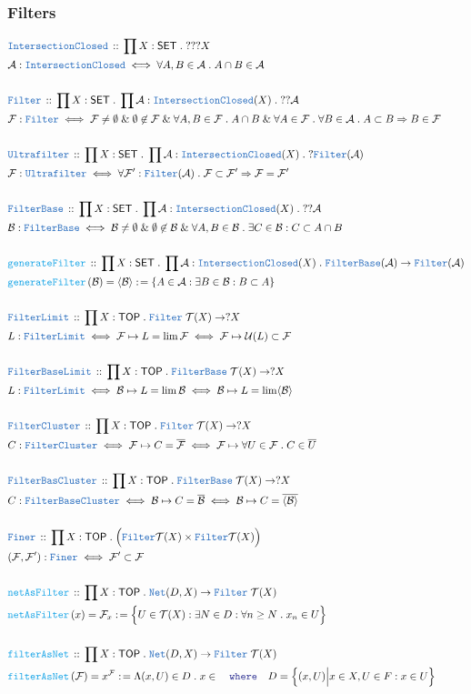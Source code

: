 \documentclass[12pt]{scrartcl}
\newcommand{\TYPE}[1]{\textcolor{NavyBlue}{\mathtt{#1}}}
\newcommand{\FUNC}[1]{\textcolor{Cerulean}{\mathtt{#1}}}
\newcommand{\LOGIC}[1]{\textcolor{Blue}{\mathtt{#1}}}
\renewcommand{\.}{\; . \;}
\newcommand{\de}{: \kern 0.1pc =}
\newcommand{\where}{\LOGIC{where}}
\newcommand{\Act}[1]{\left( #1 \right)}
\newcommand{\DeclareType}[2]{& \TYPE{#1} \, :: \, #2 \\}
\newcommand{\DefineType}[3]{& #1 : \TYPE{#2} \iff #3 \\}
\newcommand{\DefineNamedType}[4]{& #1 : \TYPE{#2} \iff #3 \iff #4 \\}
\newcommand{\DeclareFunc}[2]{& \FUNC{#1} \, :: \, #2 \\}
\newcommand{\DefineNamedFunc}[4]{&  \FUNC{#1}\Act{#2} = #3 \de #4 \\}
\newcommand{\Page}[1]{ \begin{align*} #1 \end{align*}   }
\renewcommand{\And}{\; \& \;}
\newcommand{\Imply}{\Rightarrow}
\newcommand{\A}{\mathcal{A}}
\newcommand{\B}{\mathcal{B}}
\newcommand{\SET}{\mathsf{SET}}
\newcommand{\TOP}{\mathsf{TOP}}
\newcommand{\T}{\mathcal{T}}
\newcommand{\U}{\mathcal{U}}
\newcommand{\F}{\mathcal{F}}
\begin{document}
\subsubsection{Filters}
\Page{
	\DeclareType{IntersectionClosed}{\prod X : \SET \. ???X}
	\DefineType{\A}{IntersectionClosed}{\forall A,B \in \A \. A \cap B \in \A}
	\\
	\DeclareType{Filter}{\prod X : \SET \. \prod \A : \TYPE{IntersectionClosed}(X) \. ??\A}
	\DefineType{\F}{Filter}{
		\F \neq \emptyset \And 
		\emptyset \not\in \F \And 
		\forall A,B \in \F \. A \cap B \And
		\forall A \in \F \. \forall B \in \A \. A \subset B \Imply B \in \F
	}
	\\
	\DeclareType{Ultrafilter}{\prod X : \SET \. \prod \A : \TYPE{IntersectionClosed}(X) \. ?\TYPE{Filter}(\A)}
	\DefineType{\F}{Ultrafilter}{
		\forall \F' : \TYPE{Filter}(\A) \.  \F \subset \F'  \Imply \F = \F'
	}
	\\
	\DeclareType{FilterBase}{\prod X : \SET \. \prod \A : \TYPE{IntersectionClosed}(X) \. ??\A}
	\DefineType{\B}{FilterBase}{
		\B  \neq \emptyset \And \emptyset \not \in \B \And \forall A,B \in \B \. \exists C \in \B : C \subset A \cap B
	}
	\\
	\DeclareFunc{generateFilter}{ 
		\prod X : \SET \. 
		\prod \A : \TYPE{IntersectionClosed}(X) \. 
		\TYPE{FilterBase}(\A) \to \TYPE{Filter}(\A) 
	}
	\DefineNamedFunc{generateFilter}{\B }{\langle \B \rangle}
	{
		\{ A \in \A : \exists B \in \B : B \subset A \}
	}
	\\
	\DeclareType{FilterLimit}{\prod X : \TOP \. \TYPE{Filter}\;\T(X) \to ?X}
	\DefineNamedType{L}{FilterLimit}{\F \mapsto  L = \lim \F}
	{ \F \mapsto \U(L) \subset \F }
	\\
	\DeclareType{FilterBaseLimit}{\prod X : \TOP \. \TYPE{FilterBase}\;\T(X) \to ?X}
	\DefineNamedType{L}{FilterLimit}{\B \mapsto  L = \lim \B}
	{ \B \mapsto L = \lim \langle \B \rangle  }
	\\
	\DeclareType{FilterCluster}{\prod X : \TOP \. \TYPE{Filter}\;\T(X) \to ?X}
	\DefineNamedType{C}{FilterCluster}{\F \mapsto  C= \overline{\F}}
	{ \F \mapsto \forall U \in \F \. C \in \overline{U} }
	\\
	\DeclareType{FilterBasCluster}{\prod X : \TOP \. \TYPE{FilterBase}\;\T(X) \to ?X}
	\DefineNamedType{C}{FilterBaseCluster}{\B \mapsto  C = \overline{\B}}
	{ \B \mapsto C = \overline{\langle \B \rangle} }
	\\
	\DeclareType{Finer}{\prod X : \TOP \. \Big( \TYPE{Filter} \T(X) \times \TYPE{Filter} \T(X)  \Big)}
	\DefineType{(\F,\F')}{Finer}{\F' \subset \F}
	\\
	\DeclareFunc{netAsFilter}
	{
		\prod X : \TOP \. \TYPE{Net}(D,X) \to \TYPE{Filter}\; \T(X)
	}
	\DefineNamedFunc{netAsFilter}{x}{\F_x}
	{
		\Big\{  U \in \T(X) : \exists N \in D : \forall n \ge N \. x_n \in U  \Big\}
	} 
	\\
	\DeclareFunc{filterAsNet}
	{
		\prod X : \TOP \. \TYPE{Net}(D,X) \to \TYPE{Filter}\; \T(X)
	}
	\DefineNamedFunc{filterAsNet}{\F}{x^\F}
	{
		\Lambda (x,U) \in D \. x \in  
		\quad 
		\where 
		\quad
		D = \Big\{ (x,U) \Big| x \in X , U \in F : x \in U \Big\}
	} 
}
\end{document}
